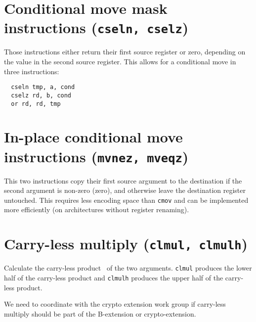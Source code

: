 
\section{Conditional move mask instructions (\texttt{cseln, cselz})}

Those instructions either return their first source register or zero, depending on the
value in the second source register. This allows for a conditional move in three instructions:

\begin{verbatim}
  cseln tmp, a, cond
  cselz rd, b, cond
  or rd, rd, tmp
\end{verbatim}




\section{In-place conditional move instructions (\texttt{mvnez, mveqz})}

This two instructions copy their first source argument to the destination if the second
argument is non-zero (zero), and otherwise leave the destination register untouched.
This requires less encoding space than \texttt{cmov} and can be implemented more
efficiently (on architectures without register renaming).


\section{Carry-less multiply (\texttt{clmul, clmulh})}

Calculate the carry-less product~\cite{CarryLessProduct} of the two arguments. \texttt{clmul}
produces the lower half of the carry-less product and \texttt{clmulh} produces the upper half
of the carry-less product.

We need to coordinate with the crypto extension work group if carry-less multiply should
be part of the B-extension or crypto-extension.




